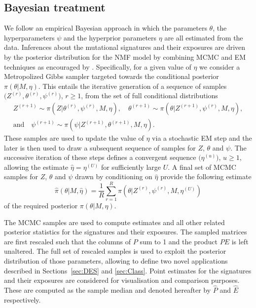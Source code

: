\documentclass{bioinfo}
\begin{document}
\subsection{Bayesian treatment}
We follow an empirical Bayesian approach in which the parameters
$\theta$, the hyperparameters $\psi$ and the hyperprior parameters
$\eta$ are all estimated from the data.  Inferences about the
mutational signatures and their exposures are driven by the posterior
distribution for the NMF model by combining MCMC and EM techniques as
encouraged by \cite{C01}. Specifically, for a given value of $\eta$ we
consider a Metropolized Gibbs sampler targeted towards the conditional
posterior $\pi(\theta|M, \eta)$. This entails the iterative generation
of a sequence of samples $\big(Z^{(r)}, \theta^{(r)},
\psi^{(r)}\big)$, $r \geq 1$, from the set of full conditional
distributions
\begin{gather*}
   Z^{(r+1)} \sim \pi(Z| \theta^{(r)}, \psi^{(r)}, M, \eta), \quad
   \theta^{(r+1)} \sim \pi(\theta| Z^{(r+1)}, \psi^{(r)}, M, \eta), \\
       \text{and}\quad
   \psi^{(r+1)} \sim \pi(\psi| Z^{(r+1)}, \theta^{(r+1)}, M, \eta).
\end{gather*}
These samples are used to update the value of $\eta$ via a stochastic
EM step and the later is then used to draw a subsequent sequence of
samples for $Z$, $\theta$ and $\psi$. The successive iteration of
these steps defines a convergent sequence $\big(\eta^{(u)}\big)$, $u
\geq 1$, allowing the estimate $\hat\eta = \eta^{(U)}$ for
sufficiently large $U$. A final set of MCMC samples for $Z$, $\theta$
and $\psi$ drawn by conditioning on $\hat\eta$ provide the following
estimate
\begin{equation}
 \label{eqn:MCEM_estimate}
   \widehat{\pi}(\theta|M, \hat\eta)
 =
   \frac{1}{R}\sum_{r=1}^R \pi(\theta|Z^{(r)}, \psi^{(r)}, M,
   \eta^{(U)})
\end{equation}
of the required posterior $\pi(\theta|M, \eta)$.

The MCMC samples are used to compute estimates and all other related
posterior statistics for the signatures and their exposures. The
sampled matrices are first rescaled such that the columns of $P$ sum
to 1 and the product $PE$ is left unaltered. The full set of rescaled
samples is used to exploit the posterior distribution of those
parameters, allowing to define two novel applications described in
Sections~\ref{sec:DES} and \ref{sec:Class}.  Point
estimates for the signatures and their exposures are considered for
visualisation and comparison purposes. These are computed as the
sample median and denoted hereafter by $\widehat P$ and $\widehat E$
respectively.
\end{document}
